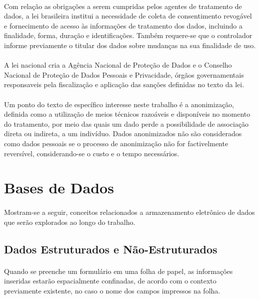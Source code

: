 \paragraph{} Com relação as obrigações a serem cumpridas pelos agentes de tratamento de dados, a lei brasileira institui a necessidade de coleta de consentimento revogável e fornecimento de acesso às informações de tratamento dos dados, incluindo a finalidade, forma, duração e identificações. Também requere-se que o controlador informe previamente o titular dos dados sobre mudanças na sua finalidade de uso.

\paragraph{} A lei nacional cria a Agência Nacional de Proteção de Dados e o Conselho Nacional de Proteção de Dados Pessoais e Privacidade, órgãos governamentais responsaveis pela fiscalização e aplicação das sanções definidas no texto da lei.

\paragraph{} Um ponto do texto de específico interesse neste trabalho é a anonimização, definida como a utilização de meios técnicos razoáveis e disponíveis no momento do tratamento, por meio das quais um dado perde a possibilidade de associação direta ou indireta, a um indivíduo. Dados anonimizados não são considerados como dados pessoais se o processo de anonimização não for factivelmente reversível, considerando-se o custo e o tempo necessários.


\section{Bases de Dados}

\paragraph{} Mostram-se a seguir, conceitos relacionados a armazenamento eletrônico de dados que serão explorados ao longo do trabalho.

\subsection{Dados Estruturados e Não-Estruturados}

\paragraph{} Quando se preenche um formulário em uma folha de papel, as informações inseridas estarão espacialmente confinadas, de acordo com o contexto previamente existente, no caso o nome dos campos impressos na folha.

